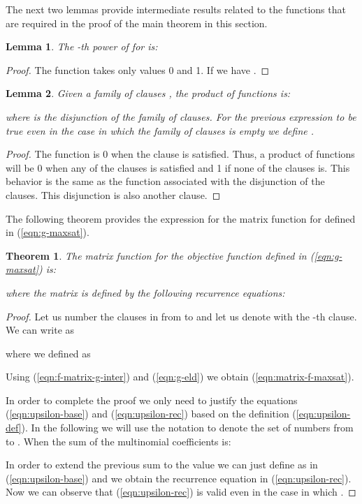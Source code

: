 \documentclass{article}
\newtheorem{theorem}{Theorem}
\newtheorem{lemma}{Lemma}
\begin{document}
The next two lemmas provide intermediate results related to the  functions that are required in the proof of the main theorem in this section.

\begin{lemma}
\label{lem:power-g}
The -th power of  for  is:

\end{lemma}
\begin{proof}
The function  takes only values 0 and 1. If  we have .
\end{proof}





\begin{lemma}
\label{lem:prod-g}
Given a family of clauses , the product of functions  is:

where  is the disjunction of the family of clauses. For the previous expression to be true even in the case in which the family of clauses is empty we define .
\end{lemma}
\begin{proof}
The function  is 0 when the clause  is satisfied. Thus, a product of  functions will be 0 when any of the clauses is satisfied and 1 if none of the clauses is. This behavior is the same as the function  associated with the disjunction of the clauses. This disjunction is also another clause. 
\end{proof}





The following theorem provides the expression for the matrix function  for  defined in (\ref{eqn:g-maxsat}). 

\begin{theorem}

The matrix function  for the objective function  defined in (\ref{eqn:g-maxsat}) is:

where the  matrix is defined by the following recurrence equations:

\end{theorem}
\begin{proof}
Let us number the clauses in  from  to  and let us denote with  the -th clause. We can write  as

where we defined  as 


Using (\ref{eqn:f-matrix-g-inter}) and (\ref{eqn:g-eld}) we obtain (\ref{eqn:matrix-f-maxsat}).

In order to complete the proof we only need to justify the equations (\ref{eqn:upsilon-base}) and (\ref{eqn:upsilon-rec}) based on the definition (\ref{eqn:upsilon-def}). 
In the following we will use the notation  to denote the set of numbers from  to .
When  the sum of the multinomial coefficients is:

In order to extend the previous sum to the value  we can just define  as in (\ref{eqn:upsilon-base}) and we obtain the recurrence equation in (\ref{eqn:upsilon-rec}). Now we can observe that (\ref{eqn:upsilon-rec}) is valid even in the case in which .
\end{proof}
\end{document}
